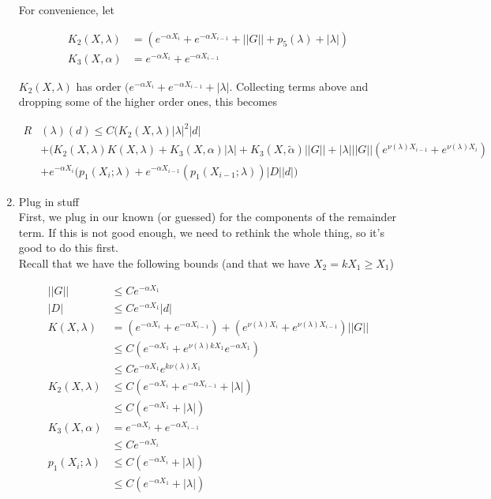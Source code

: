 \documentclass[12pt]{article}
\begin{document}
\begin{enumerate}
For convenience, let

\begin{align*}
K_2(X, \lambda) &= (e^{-\alpha X_i} + e^{-\alpha X_{i-1}} + ||G|| + p_5(\lambda) + |\lambda|) \\
K_3(X, \alpha) &= e^{-\alpha X_i} + e^{-\alpha X_{i-1}}
\end{align*}

$K_2(X, \lambda)$ has order $(e^{-\alpha X_i} + e^{-\alpha X_{i-1}} + |\lambda|$. Collecting terms above and dropping some of the higher order ones, this becomes

\begin{align*}
R&(\lambda)(d) \leq C \Big(
K_2(X, \lambda)|\lambda|^2 |d| \\
&+(K_2(X, \lambda)K(X, \lambda) + K_3(X, \alpha)|\lambda| + K_3(X, \tilde{\alpha})||G|| + |\lambda| ||G|| (e^{\nu(\lambda)X_{i-1}} + e^{\nu(\lambda)X_i})\\
&+ e^{-\alpha X_i}(p_1(X_i; \lambda) + e^{-\alpha X_{i-1}}(p_1(X_{i-1}; \lambda))|D||d| \Big)
\end{align*}

\item Plug in stuff \\

First, we plug in our known (or guessed) for the components of the remainder term. If this is not good enough, we need to rethink the whole thing, so it's good to do this first.\\

Recall that we have the following bounds (and that we have $X_2 = k X_1 \geq X_1$)

\begin{align*}
||G|| &\leq C e^{-\alpha X_1} \\
|D| &\leq C e^{-\alpha X_1} |d| \\
K(X, \lambda) &= (e^{-\alpha X_i} + e^{-\alpha X_{i-1}}) + (e^{\nu(\lambda)X_i} + e^{\nu(\lambda)X_{i-1}})||G|| \\
&\leq C(e^{-\alpha X_1} + e^{\nu(\lambda)k X_1} e^{-\alpha X_1} ) \\
&\leq C e^{-\alpha X_1} e^{k \nu(\lambda) X_1} \\
K_2(X, \lambda) &\leq C(e^{-\alpha X_i} + e^{-\alpha X_{i-1}} + |\lambda|) \\
&\leq C(e^{-\alpha X_1} + |\lambda|) \\
K_3(X, \alpha) &= e^{-\alpha X_i} + e^{-\alpha X_{i-1}} \\
&\leq C e^{-\alpha X_i} \\
p_1(X_i; \lambda) &\leq C (e^{-\alpha X_i} + |\lambda|) \\
&\leq C (e^{-\alpha X_1} + |\lambda|) \\
\end{align*}


\end{enumerate}
\end{document}
